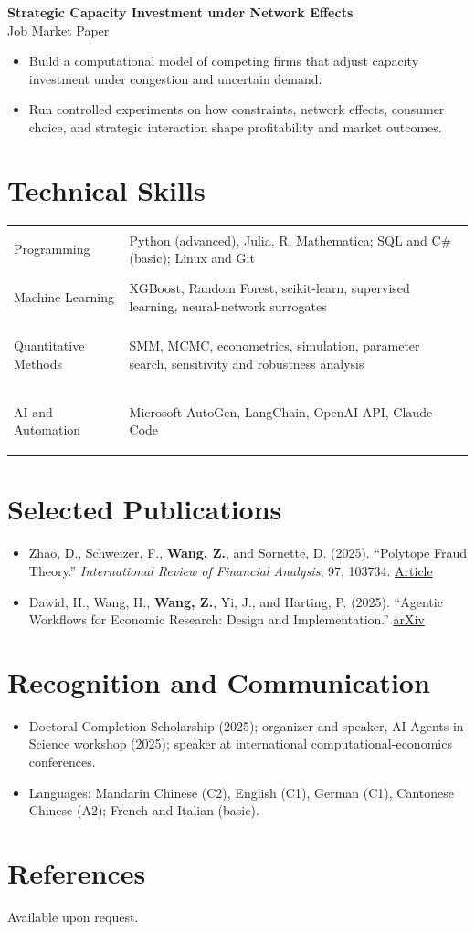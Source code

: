 \documentclass[a4paper,11pt]{article}
\newcommand{\project}[2]{%
  \textbf{#1}\\[-1pt]
  \textcolor{muted}{\small #2}\par
}
\begin{document}
\project{Strategic Capacity Investment under Network Effects}{Job Market Paper}
\begin{itemize}
  \item Build a computational model of competing firms that adjust capacity investment under congestion and uncertain demand.
  \item Run controlled experiments on how constraints, network effects, consumer choice, and strategic interaction shape profitability and market outcomes.
\end{itemize}

\section{Technical Skills}
\begin{tabularx}{\linewidth}{@{}>{\bfseries\raggedright\arraybackslash}p{3.6cm}X@{}}
Programming & Python (advanced), Julia, R, Mathematica; SQL and C\# (basic); Linux and Git\\
Machine Learning & XGBoost, Random Forest, scikit-learn, supervised learning, neural-network surrogates\\
Quantitative Methods & SMM, MCMC, econometrics, simulation, parameter search, sensitivity and robustness analysis\\
AI and Automation & Microsoft AutoGen, LangChain, OpenAI API, Claude Code\\
\end{tabularx}

\section{Selected Publications}
\begin{itemize}
  \item Zhao, D., Schweizer, F., \textbf{Wang, Z.}, and Sornette, D. (2025). ``Polytope Fraud Theory.'' \textit{International Review of Financial Analysis}, 97, 103734. \href{https://www.sciencedirect.com/science/article/pii/S1057521924006665}{Article}
  \item Dawid, H., Wang, H., \textbf{Wang, Z.}, Yi, J., and Harting, P. (2025). ``Agentic Workflows for Economic Research: Design and Implementation.'' \href{https://arxiv.org/abs/2504.09736}{arXiv}
\end{itemize}

\enlargethispage{3\baselineskip}
\section{Recognition and Communication}
\begin{itemize}
  \item Doctoral Completion Scholarship (2025); organizer and speaker, AI Agents in Science workshop (2025); speaker at international computational-economics conferences.
  \item Languages: Mandarin Chinese (C2), English (C1), German (C1), Cantonese Chinese (A2); French and Italian (basic).
\end{itemize}

\section{References}
Available upon request.
\end{document}
